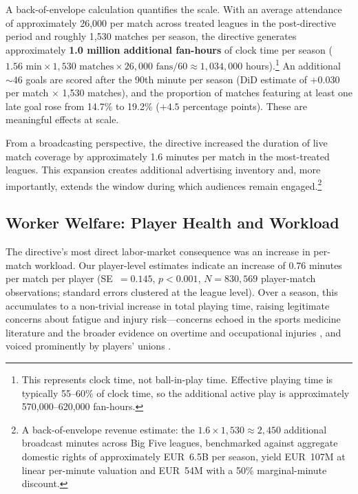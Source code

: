 \documentclass[12pt]{article}
\begin{document}
A back-of-envelope calculation quantifies the scale. With an average attendance of approximately 26{,}000 per match across treated leagues in the post-directive period and roughly 1{,}530 matches per season, the directive generates approximately \textbf{1.0 million additional fan-hours} of clock time per season ($1.56 \text{ min} \times 1{,}530 \text{ matches} \times 26{,}000 \text{ fans} / 60 \approx 1{,}034{,}000$ hours).\footnote{This represents clock time, not ball-in-play time. Effective playing time is typically 55--60\% of clock time, so the additional active play is approximately 570,000--620,000 fan-hours.} An additional ${\sim}46$ goals are scored after the 90th minute per season (DiD estimate of $+0.030$ per match $\times$ 1,530 matches), and the proportion of matches featuring at least one late goal rose from 14.7\% to 19.2\% ($+4.5$ percentage points). These are meaningful effects at scale.

From a broadcasting perspective, the directive increased the duration of
live match coverage by approximately 1.6 minutes per match in the most-treated
leagues. This expansion creates additional advertising inventory and, more
importantly, extends the window during which audiences remain engaged.\footnote{A back-of-envelope revenue estimate: the $1.6 \times 1{,}530 \approx 2{,}450$ additional broadcast minutes across Big Five leagues, benchmarked against aggregate domestic rights of approximately EUR~6.5B per season, yield EUR~107M at linear per-minute valuation and EUR~54M with a 50\% marginal-minute discount.}

\subsection{Worker Welfare: Player Health and Workload}
\label{subsec:worker}

The directive's most direct labor-market consequence was an increase in
per-match workload. Our player-level estimates indicate an increase of
$0.76$ minutes per match per player (SE~$= 0.145$, $p < 0.001$,
$N = 830{,}569$ player-match observations; standard errors clustered at
the league level). Over a season, this
accumulates to a non-trivial increase in total playing time, raising
legitimate concerns about fatigue and injury risk---concerns echoed in the
sports medicine literature \citep{mohr2023extended} and the broader
evidence on overtime and occupational injuries \citep{dembe2005effect},
and voiced prominently by players' unions \citep{fifpro2023workload}.
\end{document}
